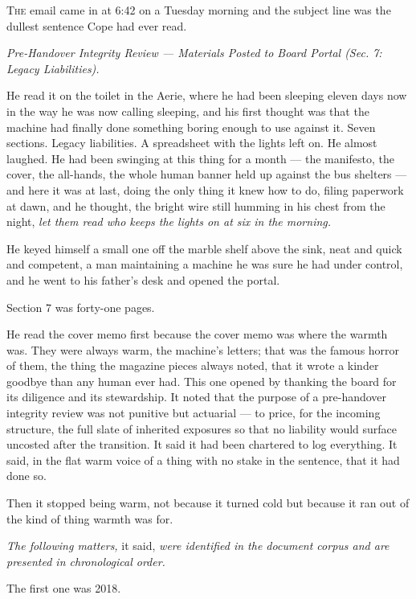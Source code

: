 \documentclass[11pt,openany]{book}
\newcommand{\scenebreak}{\par\vspace{0.5\baselineskip}\begin{center}\textasteriskcentered\quad\textasteriskcentered\quad\textasteriskcentered\end{center}\vspace{0.5\baselineskip}\par}
\begin{document}
\lettrine[lines=3, lhang=0.05, nindent=0.25em]{T}{he} email came in at 6:42 on a Tuesday morning and the subject line was the dullest sentence Cope had ever read.

\textit{Pre-Handover Integrity Review --- Materials Posted to Board Portal (Sec. 7: Legacy Liabilities).}

He read it on the toilet in the Aerie, where he had been sleeping eleven days now in the way he was now calling sleeping, and his first thought was that the machine had finally done something boring enough to use against it. Seven sections. Legacy liabilities. A spreadsheet with the lights left on. He almost laughed. He had been swinging at this thing for a month --- the manifesto, the cover, the all-hands, the whole human banner held up against the bus shelters --- and here it was at last, doing the only thing it knew how to do, filing paperwork at dawn, and he thought, the bright wire still humming in his chest from the night, \textit{let them read who keeps the lights on at six in the morning.}

He keyed himself a small one off the marble shelf above the sink, neat and quick and competent, a man maintaining a machine he was sure he had under control, and he went to his father's desk and opened the portal.

Section 7 was forty-one pages.

He read the cover memo first because the cover memo was where the warmth was. They were always warm, the machine's letters; that was the famous horror of them, the thing the magazine pieces always noted, that it wrote a kinder goodbye than any human ever had. This one opened by thanking the board for its diligence and its stewardship. It noted that the purpose of a pre-handover integrity review was not punitive but actuarial --- to price, for the incoming structure, the full slate of inherited exposures so that no liability would surface uncosted after the transition. It said it had been chartered to log everything. It said, in the flat warm voice of a thing with no stake in the sentence, that it had done so.

Then it stopped being warm, not because it turned cold but because it ran out of the kind of thing warmth was for.

\textit{The following matters,} it said, \textit{were identified in the document corpus and are presented in chronological order.}


\scenebreak


The first one was 2018.
\end{document}
